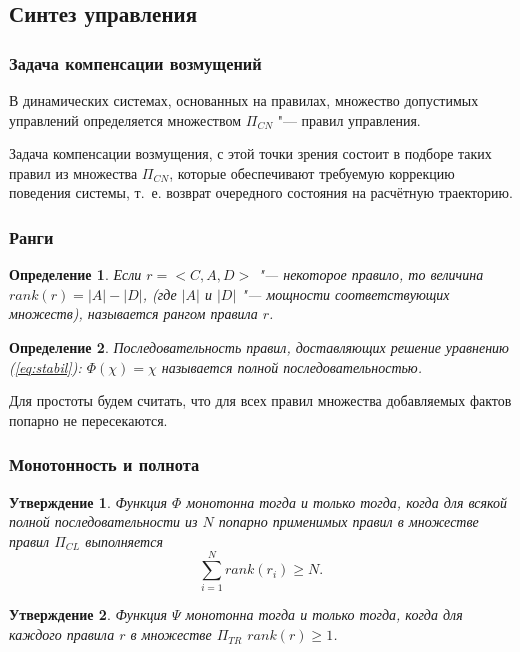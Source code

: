 \documentclass[default]{beamer}
\newtheorem{Pred}{Утверждение}
\newtheorem{Def}{Определение}
\begin{document}
	\subsection{Синтез управления}

	\begin{frame}
		\frametitle{Задача компенсации возмущений}
		
		В динамических системах, основанных на правилах, множество допустимых управлений определяется множеством $\Pi_{CN}$ "--- правил управления. 
		\par\bigskip
		Задача компенсации возмущения, с этой точки зрения состоит в подборе таких правил из множества  $\Pi_{CN}$, которые обеспечивают требуемую коррекцию поведения системы, т.~е. возврат очередного состояния на расчётную траекторию.
	\end{frame}

	\begin{frame}
		\frametitle{Ранги}
		
		\begin{Def}
			Если $r=<C,A,D>$ "--- некоторое правило, то величина $rank(r) = |A|-|D|$, (где $|A|$ и $|D|$ "--- мощности соответствующих множеств), называется рангом правила $r$. 
		\end{Def}
		
		\begin{Def}
			Последовательность правил, доставляющих решение уравнению (\ref{eq:stabil}): $\Phi(\chi)=\chi$ называется полной последовательностью.
		\end{Def}
		\par\bigskip
		Для простоты будем считать, что для всех правил множества добавляемых фактов попарно не пересекаются.
	\end{frame}

	\begin{frame}
		\frametitle{Монотонность и полнота}
		
		\begin{Pred}
			Функция $\Phi$ монотонна тогда и только тогда, когда для всякой полной последовательности из $N$ попарно применимых правил в множестве правил $\Pi_{CL}$ выполняется
			\begin{equation}
				\sum_{i=1}^{N}rank(r_i)\geqslant N.
			\end{equation}
		\end{Pred}
		
		\begin{Pred}
			Функция $\Psi$ монотонна тогда и только тогда, когда для каждого правила $r$ в множестве $\Pi_{TR}$ $rank(r)\geqslant 1$.
		\end{Pred}
	\end{frame}
\end{document}
